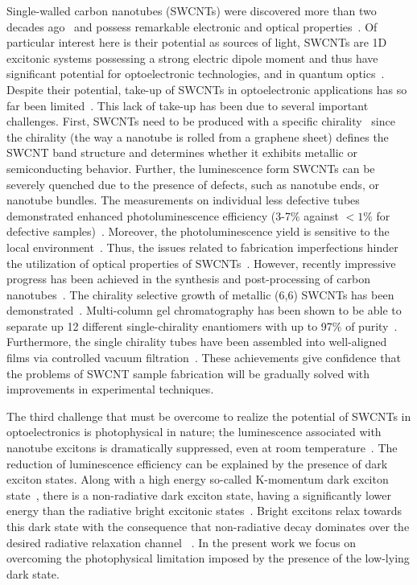 \documentclass[journal=aamick,manuscript=article]{achemso}
\begin{document}
Single-walled carbon nanotubes (SWCNTs) were discovered more than two decades ago~\cite{Iijima1991} and possess remarkable electronic and optical properties~\cite{Charlier2007}. Of particular interest here is their potential as sources of light, SWCNTs are 1D excitonic systems possessing a strong electric dipole moment and thus have significant potential for optoelectronic technologies, and in quantum optics~\cite{He_NatMat_2018}.
Despite their potential, take-up of SWCNTs in optoelectronic applications has so far been limited~\cite{Park2013,DeVolder2013}.
This lack of take-up has been due to several important challenges. First, SWCNTs need to be produced with a specific chirality~\cite{SaitoBook1998} since the chirality (the way a nanotube is rolled from a graphene sheet) defines the SWCNT band structure and determines whether it exhibits metallic or semiconducting behavior. Further, the luminescence form SWCNTs can be severely quenched due to the presence of defects, such as nanotube ends, or nanotube bundles. The measurements on individual less defective tubes demonstrated enhanced photoluminescence efficiency (3-7$\%$ against $<1\%$ for defective samples)~\cite{Lefebvre2006,Carlson2007}. Moreover, the photoluminescence yield is sensitive to the local environment~\cite{Amori2018}. Thus, the issues related to fabrication imperfections hinder the utilization of optical properties of SWCNTs~\cite{He_NatMat_2018}. However, recently impressive progress has been achieved in the synthesis and post-processing of carbon nanotubes~\cite{Janas2018}. The chirality selective growth of metallic (6,6) SWCNTs has been demonstrated~\cite{Sanchez-Valencia2014}. Multi-column gel chromatography has been shown to be able to separate up 12 different single-chirality enantiomers with up to 97$\%$ of purity~\cite{Wei2016}. Furthermore, the single chirality tubes have been assembled into well-aligned films via controlled vacuum filtration~\cite{Titova2015,He2016,GaoArxiv2018}. These achievements give confidence that the problems of SWCNT sample fabrication will be gradually solved with improvements in experimental techniques.

The third challenge that must be overcome to realize the potential of SWCNTs in optoelectronics is photophysical in nature; the luminescence associated with nanotube excitons is dramatically suppressed, even at room temperature~\cite{Shaver2007}. The reduction of luminescence efficiency can be explained by the presence of dark exciton states. Along with a high energy so-called K-momentum dark exciton state~\cite{Blackburn2012,Blackburn2016,Amori2018}, there is a non-radiative dark exciton state, having a significantly lower energy than the radiative bright excitonic states~\cite{Spataru2004,Perebeinos2004,Perebeinos2005,Scholes2007}. Bright excitons relax towards this dark state with the consequence that non-radiative decay dominates over the desired radiative relaxation channel ~\cite{Avouris2007,Avouris2008}. In the present work we focus on overcoming the photophysical limitation imposed by the presence of the low-lying dark state.
\end{document}
